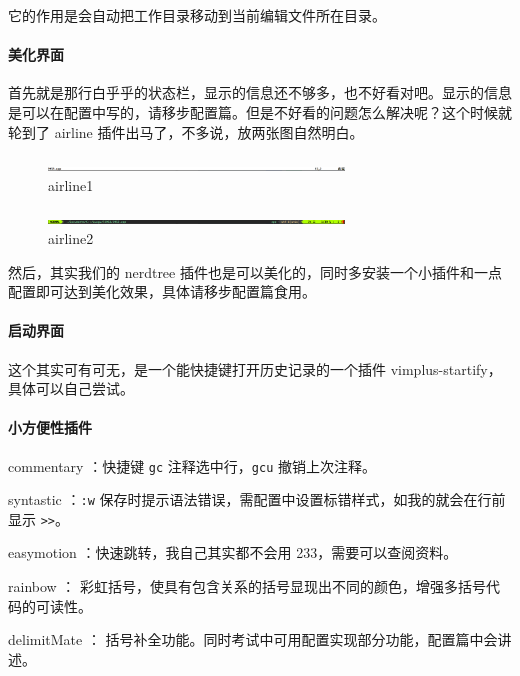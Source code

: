 它的作用是会自动把工作目录移动到当前编辑文件所在目录。

\paragraph{美化界面}

首先就是那行白乎乎的状态栏，显示的信息还不够多，也不好看对吧。显示的信息是可以在配置中写的，请移步配置篇。但是不好看的问题怎么解决呢？这个时候就轮到了 airline 插件出马了，不多说，放两张图自然明白。

\begin{figure}[htbp]
\centering
\includegraphics[width=0.7\textwidth]{docs/intro/images/airline1.png} 
\caption{airline1}
\end{figure}

\begin{figure}[htbp]
\centering
\includegraphics[width=0.7\textwidth]{docs/intro/images/airline2.png} 
\caption{airline2}
\end{figure}

然后，其实我们的 nerdtree 插件也是可以美化的，同时多安装一个小插件和一点配置即可达到美化效果，具体请移步配置篇食用。

\paragraph{启动界面}

这个其实可有可无，是一个能快捷键打开历史记录的一个插件 vimplus-startify，具体可以自己尝试。

\paragraph{小方便性插件}

commentary ：快捷键 \texttt{gc} 注释选中行，\texttt{gcu} 撤销上次注释。

syntastic ：\texttt{:w} 保存时提示语法错误，需配置中设置标错样式，如我的就会在行前显示 \texttt{>>}。

easymotion ：快速跳转，我自己其实都不会用 233，需要可以查阅资料。

rainbow ： 彩虹括号，使具有包含关系的括号显现出不同的颜色，增强多括号代码的可读性。

delimitMate ： 括号补全功能。同时考试中可用配置实现部分功能，配置篇中会讲述。

